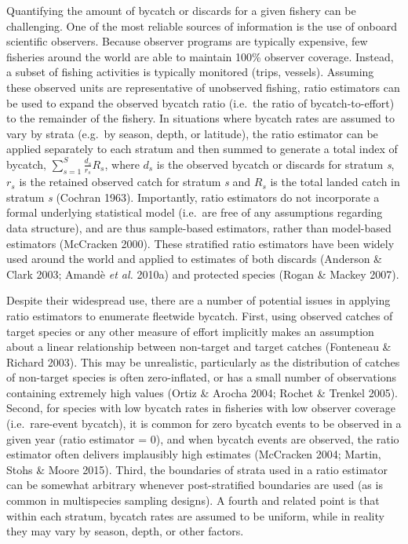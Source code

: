 \documentclass[]{article}
\begin{document}
Quantifying the amount of bycatch or discards for a given fishery can be
challenging. One of the most reliable sources of information is the use
of onboard scientific observers. Because observer programs are typically
expensive, few fisheries around the world are able to maintain 100\%
observer coverage. Instead, a subset of fishing activities is typically
monitored (trips, vessels). Assuming these observed units are
representative of unobserved fishing, ratio estimators can be used to
expand the observed bycatch ratio (i.e.~the ratio of bycatch-to-effort)
to the remainder of the fishery. In situations where bycatch rates are
assumed to vary by strata (e.g.~by season, depth, or latitude), the
ratio estimator can be applied separately to each stratum and then
summed to generate a total index of bycatch,
\(\sum_{ s=1 }^{ S }{ \frac { { d }_{ s } }{ { r }_{ s } } } { R }_{ s }\),
where \({ d }_{ s }\) is the observed bycatch or discards for stratum
\emph{s}, \({ r }_{ s }\) is the retained observed catch for stratum
\emph{s} and \({ R }_{ s }\) is the total landed catch in stratum
\emph{s} (Cochran 1963). Importantly, ratio estimators do not
incorporate a formal underlying statistical model (i.e.~are free of any
assumptions regarding data structure), and are thus sample-based
estimators, rather than model-based estimators (McCracken 2000). These
stratified ratio estimators have been widely used around the world and
applied to estimates of both discards (Anderson \& Clark 2003; Amandè
\emph{et al.} 2010a) and protected species (Rogan \& Mackey 2007).

Despite their widespread use, there are a number of potential issues in
applying ratio estimators to enumerate fleetwide bycatch. First, using
observed catches of target species or any other measure of effort
implicitly makes an assumption about a linear relationship between
non-target and target catches (Fonteneau \& Richard 2003). This may be
unrealistic, particularly as the distribution of catches of non-target
species is often zero-inflated, or has a small number of observations
containing extremely high values (Ortiz \& Arocha 2004; Rochet \&
Trenkel 2005). Second, for species with low bycatch rates in fisheries
with low observer coverage (i.e.~rare-event bycatch), it is common for
zero bycatch events to be observed in a given year (ratio estimator =
0), and when bycatch events are observed, the ratio estimator often
delivers implausibly high estimates (McCracken 2004; Martin, Stohs \&
Moore 2015). Third, the boundaries of strata used in a ratio estimator
can be somewhat arbitrary whenever post-stratified boundaries are used
(as is common in multispecies sampling designs). A fourth and related
point is that within each stratum, bycatch rates are assumed to be
uniform, while in reality they may vary by season, depth, or other
factors.
\end{document}

